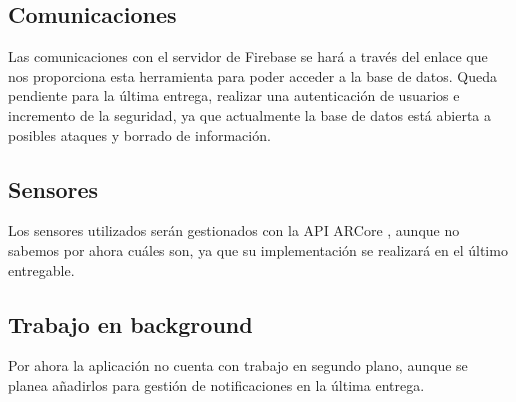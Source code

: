 \documentclass[a4paper, openright, 12pt]{article}
\begin{document}
\subsection{Comunicaciones}
Las comunicaciones con el servidor de Firebase se hará a través del enlace que nos proporciona esta herramienta para poder acceder a la base de datos. Queda pendiente para la última entrega, realizar una autenticación de usuarios e incremento de la seguridad, ya que actualmente la base de datos está abierta a posibles ataques y borrado de información.

\subsection{Sensores}
Los sensores utilizados serán gestionados con la API ARCore \cite{ARCore}, aunque no sabemos por ahora cuáles son, ya que su implementación se realizará en el último entregable.

\subsection{Trabajo en background}
Por ahora la aplicación no cuenta con trabajo en segundo plano, aunque se planea añadirlos para gestión de notificaciones en la última entrega.

\newpage



\end{document}

